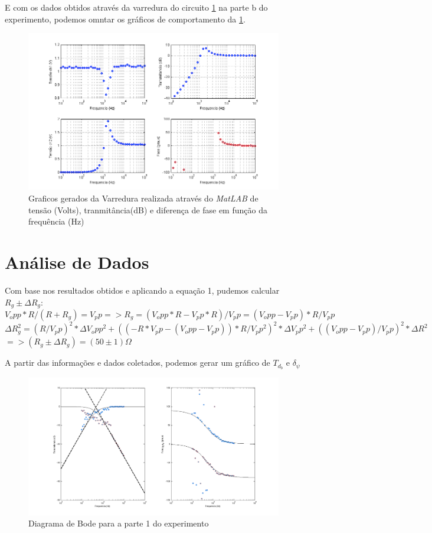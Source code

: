 \documentclass[11pt,a4paper]{article}
\begin{document}
E com os dados obtidos através da varredura do circuito \cref{} na parte b do experimento, podemos omntar os gráficos de comportamento da \cref{}.

    \begin{figure}[!htb]
    \centering
    \includegraphics[scale=0.8]{Varredura2BParte2.png}
    \caption{Graficos gerados da Varredura realizada através do \textit{MatLAB} de tensão (Volts), tranmitância(dB) e diferença de fase em função da frequência (Hz)}
    \label{Varredura2BParte2}
    \end{figure}




\section{Análise de Dados}

Com base nos resultados obtidos e aplicando a equação 1, pudemos calcular $R_g \pm \Delta R_g$:\\
$V_opp * R / (R + R_g) = V_pp => R_g = (V_opp * R - V_pp * R)/V_pp = (V_opp - V_pp)*R/V_pp$\\
$\Delta R_g^2 = (R/V_pp)^2 * \Delta V_opp^2 + ((-R*V_pp - (V_opp - V_pp)) * R/V_pp^2)^2 * \Delta V_pp^2 + ((V_opp - V_pp)/V_pp)^2 * \Delta R^2$\\
$=> (R_g \pm \Delta R_g) = (50 \pm 1) \Omega$

A partir das informações e dados coletados, podemos gerar um gráfico de $T_d_b$ e $\delta$$_\psi$
\newpage
    \begin{figure}[!htb]
    \centering
    \includegraphics[scale=0.5]{3.png}
    \caption{Diagrama de Bode para a parte 1 do experimento}
    \label{3}
    \end{figure}
    
\end{document}

